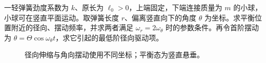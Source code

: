 \begin{example}[弹簧摆的线性分离与内共振]\label{deep4:problem-example-7}\label{deep4:ex:d7-e7}
一轻弹簧劲度系数为 $k$、原长为 $\ell_0>0$，上端固定，下端连接质量为 $m$ 的小球，小球可在竖直平面运动。取弹簧长度 $r$、偏离竖直向下的角度 $\theta$ 为坐标。求平衡位置附近的径向、摆动频率，并求两者满足 $\omega_r=2\omega_\theta$ 时的参数条件。再令首阶摆动为 $\theta=\Theta\cos\omega_\theta t$，求它引起的最低阶径向驱动项。
\end{example}
\begin{figure}[H]\centering
{}
\caption{径向伸缩与角向摆动使用不同坐标；平衡态为竖直悬垂。}\label{deep4:fig:d7-e7-q}
\end{figure}

